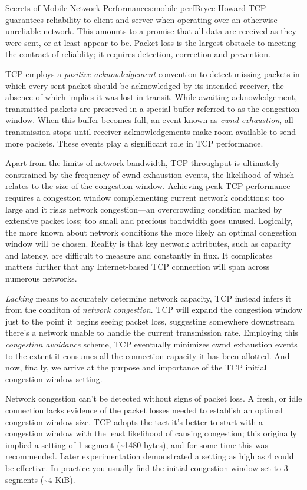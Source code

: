 \begin{aosachapter}{Secrets of Mobile Network Performance}{s:mobile-perf}{Bryce Howard}
TCP guarantees reliability to client and server when operating over an
otherwise unreliable network. This amounts to a promise that all data
are received as they were sent, or at least appear to be. Packet loss is
the largest obstacle to meeting the contract of reliablity; it requires
detection, correction and prevention.

TCP employs a \emph{positive acknowledgement} convention to detect
missing packets in which every sent packet should be acknowledged by its
intended receiver, the absence of which implies it was lost in transit.
While awaiting acknowledgement, transmitted packets are preserved in a
special buffer referred to as the congestion window. When this buffer
becomes full, an event known as \emph{cwnd exhaustion}, all transmission
stops until receiver acknowledgements make room available to send more
packets. These events play a significant role in TCP performance.

Apart from the limits of network bandwidth, TCP throughput is ultimately
constrained by the frequency of cwnd exhaustion events, the likelihood
of which relates to the size of the congestion window. Achieving peak
TCP performance requires a congestion window complementing current
network conditions: too large and it risks network congestion---an
overcrowding condition marked by extensive packet loss; too small and
precious bandwidth goes unused. Logically, the more known about network
conditions the more likely an optimal congestion window will be chosen.
Reality is that key network attributes, such as capacity and latency,
are difficult to measure and constantly in flux. It complicates matters
further that any Internet-based TCP connection will span across numerous
networks.

\emph{Lacking} means to accurately determine network capacity, TCP
instead infers it from the conditon of \emph{network congestion}. TCP
will expand the congestion window just to the point it begins seeing
packet loss, suggesting somewhere downstream there's a network unable to
handle the current transmission rate. Employing this \emph{congestion
avoidance} scheme, TCP eventually minimizes cwnd exhaustion events to
the extent it consumes all the connection capacity it has been allotted.
And now, finally, we arrive at the purpose and importance of the TCP
initial congestion window setting.

Network congestion can't be detected without signs of packet loss. A
fresh, or idle connection lacks evidence of the packet losses needed to
establish an optimal congestion window size. TCP adopts the tact it's
better to start with a congestion window with the least likelihood of
causing congestion; this originally implied a setting of 1 segment
(\textasciitilde{}1480 bytes), and for some time this was recommended.
Later experimentation demonstrated a setting as high as 4 could be
effective. In practice you usually find the initial congestion window
set to 3 segments (\textasciitilde{}4 KiB).


\end{aosachapter}
